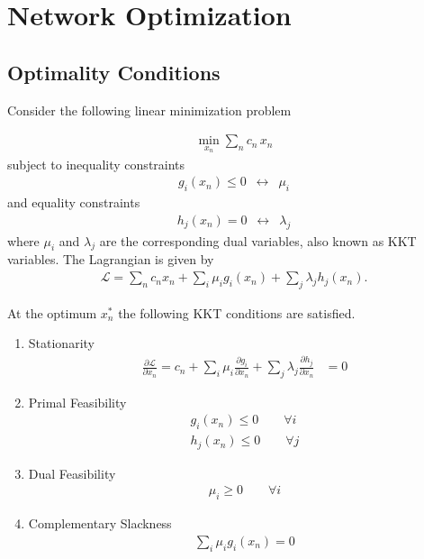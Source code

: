 \documentclass[11pt,twocolumn]{article}
\newcommand{\resultsin}[1]{\hspace{6pt} \leftrightarrow  \hspace{6pt} #1}
\newcommand{\pdv}[2]{\frac{\partial #1}{\partial #2}}
\newcommand{\lagrangian}{\mathcal{L}}
\begin{document}
\renewcommand\theequation{\thesection.\arabic{equation}}
\setcounter{equation}{0}

\renewcommand\thefigure{\thesection.\arabic{figure}}    
\setcounter{figure}{0}    

\section{Network Optimization}

\subsection{Optimality Conditions}
\label{sec:optimality_conditions}

Consider the following linear minimization problem

\begin{align}
    \min_{x_n} \sum_n c_n \, x_n
\end{align}
subject to inequality constraints
\begin{align}
    g_i(x_n) \le 0 \resultsin{\mu_i}
\end{align}
and equality constraints
\begin{align}
    h_j(x_n) = 0 \resultsin{\lambda_j}
\end{align}
where $\mu_i$ and $\lambda_j$ are the corresponding dual variables, also known as \ac{KKT} variables. 
The Lagrangian is given by 
\begin{align}
    \lagrangian = \sum_n c_n x_n + \sum_i \mu_i g_i(x_n) + \sum_j \lambda_j h_j(x_n).
\end{align}

At the optimum $x^*_n$ the following \ac{KKT} conditions are satisfied. 
\begin{enumerate}
    \item Stationarity \\
    \begin{align}
         \pdv{\lagrangian}{x_n} = c_n + \sum_i \mu_i \pdv{g_i}{x_n} + \sum_j \lambda_j \pdv{h_j}{x_n} &= 0  
    \end{align}
    \item Primal Feasibility \\
    \begin{align}
        g_i(x_n) \le 0 \qquad \forall i \\
        h_j(x_n) \le 0 \qquad \forall j 
    \end{align}
    \item Dual Feasibility \\
    \begin{align}
        \mu_i \ge 0 \qquad \forall i
    \end{align}
    \item Complementary Slackness \\
    \begin{align}
        \sum_i \mu_i g_i(x_n) = 0
    \end{align}
\end{enumerate}
\end{document}
